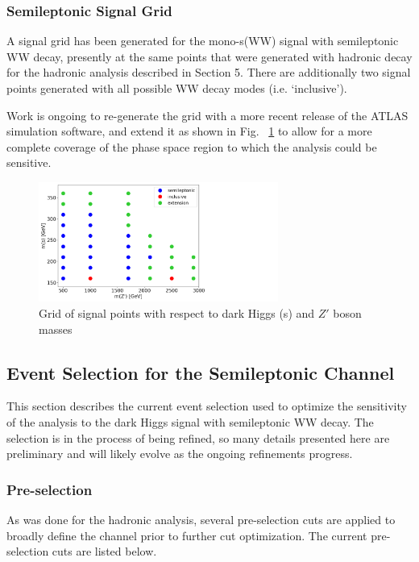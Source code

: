 \documentclass[12pt]{article}
\begin{document}
\subsubsection{Semileptonic Signal Grid}

A signal grid has been generated for the mono-s(WW) signal with semileptonic WW decay, presently at the same points that were generated with hadronic decay for the hadronic analysis described in Section 5. There are additionally two signal points generated with all possible WW decay modes (i.e. `inclusive'). 

Work is ongoing to re-generate the grid with a more recent release of the ATLAS simulation software, and extend it as shown in Fig. ~\ref{fig:signalgrid} to allow for a more complete coverage of the phase space region to which the analysis could be sensitive.

\begin{figure}[H]
	\centering
	\includegraphics[width=0.7\textwidth]{figures/SignalGrid_simple.png}
	\caption[]{Grid of signal points with respect to dark Higgs (s) and $Z'$ boson masses}
	\label{fig:signalgrid}
\end{figure}

\subsection{Event Selection for the Semileptonic Channel}

This section describes the current event selection used to optimize the sensitivity of the analysis to the dark Higgs signal with semileptonic WW decay. The selection is in the process of being refined, so many details presented here are preliminary and will likely evolve as the ongoing refinements progress. 

\subsubsection{Pre-selection}

As was done for the hadronic analysis, several pre-selection cuts are applied to broadly define the channel prior to further cut optimization. The current pre-selection cuts are listed below.
\end{document}
